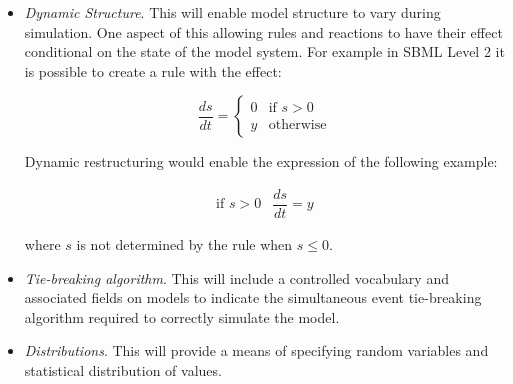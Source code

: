 \begin{itemize}
\item \emph{Dynamic Structure}.  This will enable model structure
  to vary during simulation.  One aspect of this allowing rules
  and reactions to have their effect conditional on the state of
  the model system.  For example in SBML Level 2 it is possible to
  create a rule with the effect:
\begin{linenomath}
\begin{equation*}
\frac{d s}{d t} =
\left\{
\begin{array}{ll}
     0 & \mbox{if $s>0$}\\
     y & \mbox{otherwise}
\end{array}
\right.
\end{equation*}
\end{linenomath}
Dynamic restructuring would enable the expression of the following example:
\begin{linenomath}
\begin{equation*}
\begin{array}{ll}
\mbox{if $s>0$} & \dfrac{d s}{d t} = y
\end{array}
\end{equation*}
\end{linenomath}
where $s$ is not determined by the rule when $s \leq 0$.

\item \emph{Tie-breaking algorithm}.  This will include a
  controlled vocabulary and associated fields on models to
  indicate the simultaneous event tie-breaking algorithm required
  to correctly simulate the model.
  
\item \emph{Distributions}.  This will provide a means of
  specifying random variables and statistical distribution of
  values.

\end{itemize}




